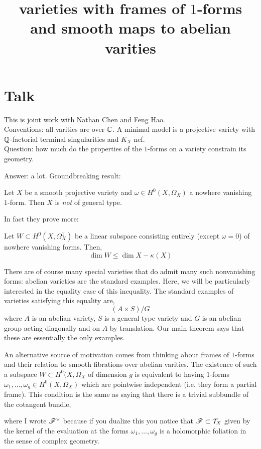 \documentclass[12pt]{article}
\begin{document}
\section{Talk}

\title{varieties with frames of $1$-forms and smooth maps to abelian varities}

This is joint work with Nathan Chen and Feng Hao. 
\\
Conventions: all varities are over $\mathbb{C}$. A minimal model is a projective variety with $\mathbb{Q}$-factorial terminal singularities and $K_X$ nef. 
\\ 

Question: how much do the properties of the $1$-forms on a variety constrain its geometry.

Answer: a lot. Groundbreaking result:

\begin{theorem}
Let $X$ be a smooth projective variety and $\omega \in H^0(X, \Omega_X)$ a nowhere vanishing $1$-form. Then $X$ is \textit{not} of general type. 
\end{theorem}

In fact they prove more:

\begin{theorem}
Let $W \subset H^0(X, \Omega^1_X)$ be a linear subspace consisting entirely (except $\omega = 0$) of nowhere vanishing forms. Then,
\[ \dim{W} \le \dim{X} - \kappa(X) \] 
\end{theorem}

There are of course many special varieties that do admit many such nonvanishing forms: abelian varieties are the standard examples. Here, we will be particularly interested in the equality case of this inequality. The standard examples of varieties satisfying this equality are,
\[ (A \times S) / G \]
where $A$ is an abelian variety, $S$ is a general type variety and $G$ is an abelian group acting diagonally and on $A$ by translation. Our main theorem says that these are essentially the only examples.


An alternative source of motivation comes from thinking about frames of $1$-forms and their relation to smooth fibrations over abelian varities. The existence of such a subspace $W \subset H^0(X, \Omega_X$ of dimension $g$ is equivalent to having $1$-forms $\omega_1, \dots, \omega_g \in H^0(X, \Omega_X)$ which are pointwise independent (i.e. they form a partial frame). This condition is the same as saying that there is a trivial subbundle of the cotangent bundle,
\begin{center}
\end{center}
where I wrote $\mathscr{F}^\vee$ because if you dualize this you notice that $\mathscr{F} \subset \mathcal{T}_X$ given by the kernel of the evaluation at the forms $\omega_1, \dots, \omega_g$ is a holomorphic foliation in the sense of complex geometry. 
\end{document}
